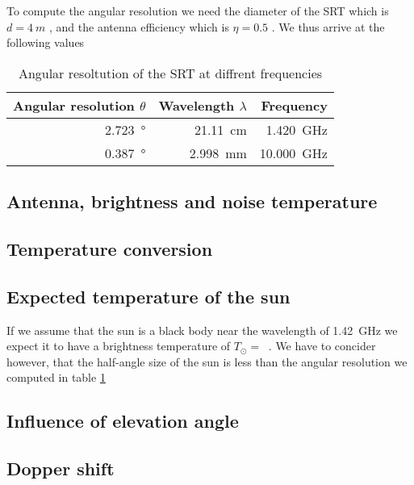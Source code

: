 To compute the angular resolution we need the diameter of the SRT which is $d = \SI{4}{m}$ \cite[p. 4]{srt}, and the antenna efficiency which is $\eta = 0.5$ \cite[p. 2]{srt}.
We thus arrive at the following values
\begin{table}[h]
    \centering
    \begin{tabular}{rrr}
        \toprule
        Angular resolution $\theta$ & Wavelength $\lambda$ & Frequency\\
        \midrule
        \SI{2.723}{\degree} & \SI{21.11}{cm} & \SI{1.420}{\giga \hertz}\\
        \SI{0.387}{\degree} & \SI{2.998}{mm} & \SI{10.000}{\giga \hertz}\\
        \bottomrule
    \end{tabular}
    \caption{Angular resoltution of the SRT at diffrent frequencies}
    \label{tab:ang_res}
\end{table}


\subsection{Antenna, brightness and noise temperature}

\subsection{Temperature conversion}

\subsection{Expected temperature of the sun}
If we assume that the sun is a black body near the wavelength of \SI{1.42}{\giga\hertz} we expect it to have a brightness temperature of $T_{\odot} = \SI{}{}$ \cite{ftb}.
We have to concider however, that the half-angle size of the sun is less than the angular resolution we computed in table \ref{tab:ang_res}


\subsection{Influence of elevation angle}

\subsection{Dopper shift}